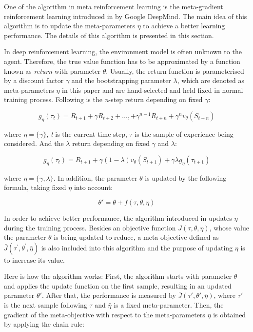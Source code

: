 One of the algorithm in meta reinforcement learning is the meta-gradient reinforcement learning introduced in \cite{meta-gradient} by Google DeepMind. The main idea of this algorithm is to update the meta-parameters $\eta$ to achieve a better learning performance. The details of this algorithm is presented in this section.

\par
In deep reinforcement learning, the environment model is often unknown to the agent. Therefore, the true value function has to be approximated by a function known as \textit{return} with parameter $\theta$. Usually, the return function is parameterised by a discount factor $\gamma$ and the bootstrapping parameter $\lambda$, which are denoted as meta-parameters $\eta$ in this paper and are hand-selected and held fixed in normal training process. Following is the \textit{n}-step return\cite{n-step-return} depending on fixed $\gamma$:

\[g_{\eta}\left(\tau_{t}\right)=R_{t+1}+\gamma R_{t+2}+\ldots,+\gamma^{n-1} R_{t+n}+\gamma^{n} v_{\theta}\left(S_{t+n}\right)\]

where $\eta = \{\gamma\}$, \textit{t} is the current time step, $\tau$ is the sample of experience being considered. And the $\lambda$ return\cite{lambda-return} depending on fixed $\gamma$ and $\lambda$:

\[g_{\eta}\left(\tau_{t}\right)=R_{t+1}+\gamma(1-\lambda) v_{\theta}\left(S_{t+1}\right)+\gamma \lambda g_{\eta}\left(\tau_{t+1}\right)\]

where $\eta = \{\gamma, \lambda\}$. In addition, the parameter $\theta$ is updated by the following formula, taking fixed $\eta$ into account:

\[\theta' = \theta + f(\tau, \theta, \eta)\]

\par
In order to achieve better performance, the algorithm introduced in \cite{meta-gradient} updates $\eta$ during the training process. Besides an objective function $J(\tau, \theta, \eta)$, whose value the parameter $\theta$ is being updated to reduce, a meta-objective defined as $\bar{J}\left(\tau^{\prime}, \theta^{\prime}, \bar{\eta}\right)$ is also included into this algorithm and the purpose of updating $\eta$ is to increase its value.

\par
Here is how the algorithm works: First, the algorithm starts with parameter $\theta$ and applies the update function on the first sample, resulting in an updated parameter $\theta'$. After that, the performance is measured by $\bar{J}(\tau', \theta', \bar{\eta})$, where $\tau'$ is the next sample following $\tau$ and $\bar{\eta}$ is a fixed meta-parameter. Then, the gradient of the meta-objective with respect to the meta-parameters $\eta$ is obtained by applying the chain rule:

